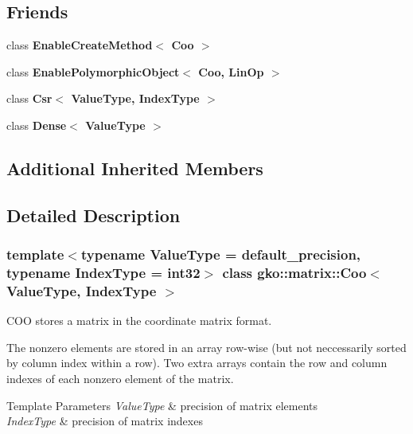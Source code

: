 \subsection*{Friends}
\begin{DoxyCompactItemize}
\item 
\mbox{\label{classgko_1_1matrix_1_1Coo_a7b73c83603cbcededd15ded9a873ea33}} 
class {\bfseries Enable\+Create\+Method$<$ Coo $>$}
\item 
\mbox{\label{classgko_1_1matrix_1_1Coo_a29c635db859b174df4d1cdc8be3ff2be}} 
class {\bfseries Enable\+Polymorphic\+Object$<$ Coo, Lin\+Op $>$}
\item 
\mbox{\label{classgko_1_1matrix_1_1Coo_a3962faf971a3df6ff4c9226c61fb24cc}} 
class {\bfseries Csr$<$ Value\+Type, Index\+Type $>$}
\item 
\mbox{\label{classgko_1_1matrix_1_1Coo_a22a84c8f67f946aa60a2fa8bf5835a32}} 
class {\bfseries Dense$<$ Value\+Type $>$}
\end{DoxyCompactItemize}
\subsection*{Additional Inherited Members}


\subsection{Detailed Description}
\subsubsection*{template$<$typename Value\+Type = default\+\_\+precision, typename Index\+Type = int32$>$\newline
class gko\+::matrix\+::\+Coo$<$ Value\+Type, Index\+Type $>$}

C\+OO stores a matrix in the coordinate matrix format. 

The nonzero elements are stored in an array row-\/wise (but not neccessarily sorted by column index within a row). Two extra arrays contain the row and column indexes of each nonzero element of the matrix.


\begin{DoxyTemplParams}{Template Parameters}
{\em Value\+Type} & precision of matrix elements \\
\hline
{\em Index\+Type} & precision of matrix indexes \\
\hline
\end{DoxyTemplParams}


